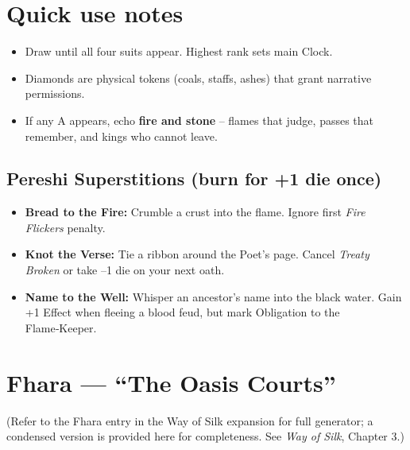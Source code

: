 \documentclass[11pt]{book}
\begin{document}
\section*{Quick use notes}
\begin{itemize}
\item Draw until all four suits appear. Highest rank sets main Clock.
\item Diamonds are physical tokens (coals, staffs, ashes) that grant narrative permissions.
\item If any A appears, echo \textbf{fire and stone} – flames that judge, passes that remember, and kings who cannot leave.
\end{itemize}

\subsection*{Pereshi Superstitions (burn for +1 die once)}
\begin{itemize}
\item \textbf{Bread to the Fire:} Crumble a crust into the flame. Ignore first \textit{Fire Flickers} penalty.
\item \textbf{Knot the Verse:} Tie a ribbon around the Poet’s page. Cancel \textit{Treaty Broken} or take –1 die on your next oath.
\item \textbf{Name to the Well:} Whisper an ancestor’s name into the black water. Gain +1 Effect when fleeing a blood feud, but mark Obligation to the Flame‑Keeper.
\end{itemize}


\section{Fhara — ``The Oasis Courts''}
\label{sec:fhara}

(Refer to the Fhara entry in the Way of Silk expansion for full generator; a condensed version is provided here for completeness. See \textit{Way of Silk}, Chapter 3.)
\end{document}
